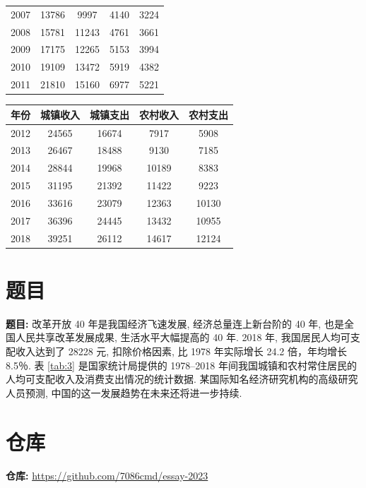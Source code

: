 \documentclass{article}
\begin{document}
\begin{appendices}
\begin{table}[H]
\begin{tabular}{ccccc}
    2007 & 13786 & 9997 & 4140 & 3224 \\
    2008 & 15781 & 11243 & 4761 & 3661 \\
    2009 & 17175 & 12265 & 5153 & 3994 \\
    2010 & 19109 & 13472 & 5919 & 4382 \\
    2011 & 21810 & 15160 & 6977 & 5221 \\
    \hline
  \end{tabular}
\end{table}
\begin{table}[H]
  \centering
  \begin{tabular}{ccccc}
    \hline
    \textbf{年份} & \textbf{城镇收入} & \textbf{城镇支出} & \textbf{农村收入} & \textbf{农村支出} \\
    \hline
    2012 & 24565 & 16674 & 7917 & 5908 \\
    2013 & 26467 & 18488 & 9130 & 7185 \\
    2014 & 28844 & 19968 & 10189 & 8383 \\
    2015 & 31195 & 21392 & 11422 & 9223 \\
    2016 & 33616 & 23079 & 12363 & 10130 \\
    2017 & 36396 & 24445 & 13432 & 10955 \\
    2018 & 39251 & 26112 & 14617 & 12124 \\
    \hline
  \end{tabular}
\end{table}

\section{题目}

\begin{mdframed}
  \fangsong
  \textbf{题目:} 改革开放 40 年是我国经济飞速发展, 经济总量连上新台阶的 40 年, 也是全国人民共享改革发展成果, 生活水平大幅提高的 40 年. 2018 年, 我国居民人均可支配收入达到了 28228 元, 扣除价格因素, 比 1978 年实际增长 24.2 倍，年均增长 8.5％. 表 \ref{tab:3} 是国家统计局提供的 1978--2018 年间我国城镇和农村常住居民的人均可支配收入及消费支出情况的统计数据. 某国际知名经济研究机构的高级研究人员预测, 中国的这一发展趋势在未来还将进一步持续.
\end{mdframed}

\section{仓库}

\begin{mdframed}
  \fangsong
  \textbf{仓库:} \url{
    https://github.com/7086cmd/essay-2023
  }
\end{mdframed}
\end{appendices}
\end{document}
